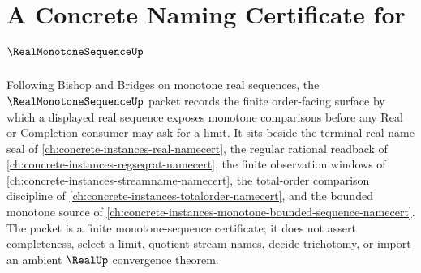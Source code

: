 \chapter{A Concrete Naming Certificate for $\RealMonotoneSequenceUp$}
\label{ch:concrete-instances-real-monotone-sequence-namecert}

Following Bishop and Bridges on monotone real sequences, the $\RealMonotoneSequenceUp$ packet records the finite order-facing surface by which a displayed real sequence exposes monotone comparisons before any Real or Completion consumer may ask for a limit. It sits beside the terminal real-name seal of \autoref{ch:concrete-instances-real-namecert}, the regular rational readback of \autoref{ch:concrete-instances-regseqrat-namecert}, the finite observation windows of \autoref{ch:concrete-instances-streamname-namecert}, the total-order comparison discipline of \autoref{ch:concrete-instances-totalorder-namecert}, and the bounded monotone source of \autoref{ch:concrete-instances-monotone-bounded-sequence-namecert}. The packet is a finite monotone-sequence certificate; it does not assert completeness, select a limit, quotient stream names, decide trichotomy, or import an ambient $\RealUp$ convergence theorem.

